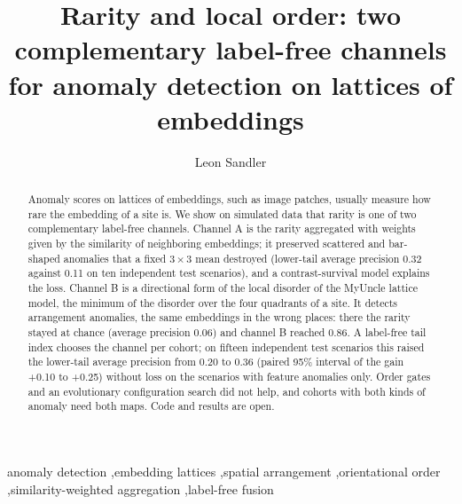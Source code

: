 \documentclass[final,5p,times,twocolumn,authoryear]{elsarticle}
\begin{document}
\begin{frontmatter}

\title{Rarity and local order: two complementary label-free channels for anomaly detection on lattices of embeddings}

\author[a]{Leon Sandler}
\address[a]{Independent Researcher, Northbrook, IL, USA}

\begin{abstract}
Anomaly scores on lattices of embeddings, such as image patches, usually measure how rare the embedding of a site is. We show on simulated data that rarity is one of two complementary label-free channels. Channel A is the rarity aggregated with weights given by the similarity of neighboring embeddings; it preserved scattered and bar-shaped anomalies that a fixed $3\times3$ mean destroyed (lower-tail average precision 0.32 against 0.11 on ten independent test scenarios), and a contrast-survival model explains the loss. Channel B is a directional form of the local disorder of the MyUncle lattice model, the minimum of the disorder over the four quadrants of a site. It detects arrangement anomalies, the same embeddings in the wrong places: there the rarity stayed at chance (average precision 0.06) and channel B reached 0.86. A label-free tail index chooses the channel per cohort; on fifteen independent test scenarios this raised the lower-tail average precision from 0.20 to 0.36 (paired 95\% interval of the gain +0.10 to +0.25) without loss on the scenarios with feature anomalies only. Order gates and an evolutionary configuration search did not help, and cohorts with both kinds of anomaly need both maps. Code and results are open.
\end{abstract}

\begin{keyword}
anomaly detection \sep embedding lattices \sep spatial arrangement \sep orientational order \sep similarity-weighted aggregation \sep label-free fusion
\end{keyword}

\end{frontmatter}
\end{document}
